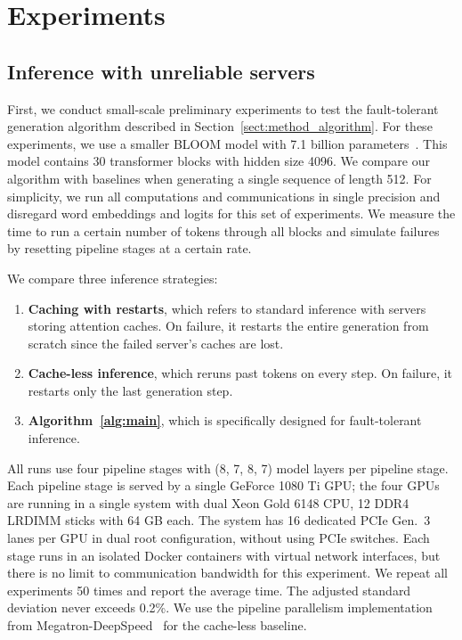 \section{Experiments}\label{sect:experiments}

\subsection{Inference with unreliable servers}\label{sect:experiments_basic}

First, we conduct small-scale preliminary experiments to test the fault-tolerant generation algorithm described in Section~\ref{sect:method_algorithm}.
For these experiments, we use a smaller BLOOM model with 7.1 billion parameters~\citep{bloom-7b1}. This model contains 30 transformer blocks with hidden size 4096. We compare our algorithm with baselines when generating a single sequence of length 512. For simplicity, we run all computations and communications in single precision and disregard word embeddings and logits for this set of experiments. We measure the time to run a certain number of tokens through all blocks and simulate failures by resetting pipeline stages at a certain rate.


We compare three inference strategies:
\begin{enumerate}
    \vspace{-2px}
    \item \textbf{Caching with restarts}, which refers to standard inference with servers storing attention caches. On failure, it restarts the entire generation from scratch since the failed server's caches are lost.
    \vspace{-2px}
    \item \textbf{Cache-less inference}, which reruns past tokens on every step. On failure, it restarts only the last generation step.
    \vspace{-2px}
    \item \textbf{Algorithm~\ref{alg:main}}, which is specifically designed for fault-tolerant inference.
    \vspace{-2px}
\end{enumerate}

All runs use four pipeline stages with (8, 7, 8, 7) model layers per pipeline stage. Each pipeline stage is served by a single GeForce 1080 Ti GPU; the four GPUs are running in a single system with dual Xeon Gold 6148 CPU, 12 DDR4 LRDIMM sticks with 64 GB each. The system has 16 dedicated PCIe Gen.~3 lanes per GPU in dual root configuration, without using PCIe switches. Each stage runs in an isolated Docker containers with virtual network interfaces, but there is no limit to communication bandwidth for this experiment. We repeat all experiments 50 times and report the average time. The adjusted standard deviation never exceeds 0.2\%. We use the pipeline parallelism implementation from Megatron-DeepSpeed~\citep{bigscience-megatron-deepspeed} for the cache-less baseline.


